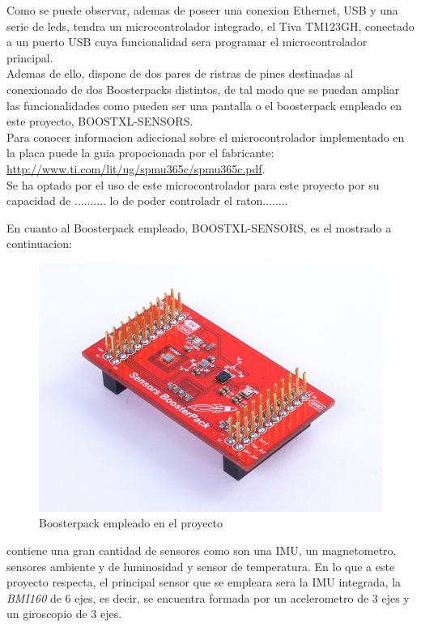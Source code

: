 \documentclass[a4paper,twoside]{article}
\begin{document}
Como se puede observar, ademas de poseer una conexion Ethernet, USB y una serie de leds, tendra un microcontrolador integrado, el Tiva TM123GH, conectado a un puerto USB cuya funcionalidad sera programar el microcontrolador principal. \\
Ademas de ello, dispone de dos pares de ristras de pines destinadas al conexionado de dos Boosterpacks distintos, de tal modo que se puedan ampliar las funcionalidades como pueden ser una pantalla o el boosterpack empleado en este proyecto, BOOSTXL-SENSORS. \\

Para conocer informacion adiccional sobre el microcontrolador implementado en la placa puede la guia propocionada por el fabricante: \url{http://www.ti.com/lit/ug/spmu365c/spmu365c.pdf}. \\

Se ha optado por el uso de este microcontrolador para este proyecto por su capacidad de .......... lo de poder controladr el raton........
\newpage

En cuanto al Boosterpack empleado, BOOSTXL-SENSORS, es el mostrado a continuacion: \\
\begin{figure}[h!]
 \centering
 \includegraphics[width=.4\textwidth]{../images/sensors_bp}
 \caption{Boosterpack empleado en el proyecto}
\end{figure}

contiene una gran cantidad de sensores como son una IMU, un magnetometro, sensores ambiente y de luminosidad y sensor de temperatura. En lo que a este proyecto respecta, el principal sensor que se empleara sera la IMU integrada, la \textit{BMI160} de 6 ejes, es decir, se encuentra formada por un acelerometro de 3 ejes y un giroscopio de 3 ejes. \\
\end{document}
